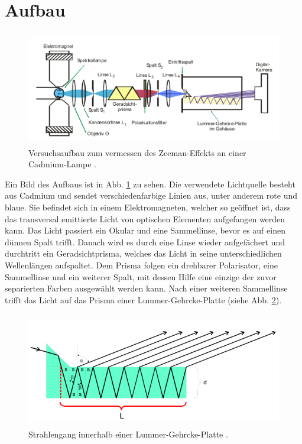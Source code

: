 


    \section{Aufbau}

        
        \begin{figure}[H]
            \centering
            \includegraphics[height=5cm]{aufbau.png}
            \caption{Versuchsaufbau zum vermessen des Zeeman-Effekts an einer Cadmium-Lampe \cite{anneu}.}
            \label{fig:aufbau}
        \end{figure}

        Ein Bild des Aufbaus ist in Abb. \ref{fig:aufbau} zu sehen.
        Die verwendete Lichtquelle besteht aus Cadmium und sendet verschiedenfarbige 
        Linien aus, unter anderem rote und blaue. Sie befindet sich in einem Elektromagneten, 
        welcher so geöffnet ist, dass das transversal emittierte Licht von 
        optischen Elementen aufgefangen werden kann. 
        Das Licht passiert ein Okular und eine Sammellinse, bevor es auf einen dünnen 
        Spalt trifft. Danach wird es durch eine Linse wieder aufgefächert und durchtritt ein 
        Geradsichtprisma, welches das Licht in seine unterschiedlichen Wellenlängen aufspaltet. 
        Dem Prisma folgen ein drehbarer Polarisator, eine Sammellinse und ein weiterer Spalt, 
        mit dessen Hilfe eine einzige der zuvor separierten Farben ausgewählt werden kann. 
        Nach einer weiteren Sammellinse trifft das Licht auf das Prisma einer Lummer-Gehrcke-Platte (siehe Abb. \ref{fig:lummer}). 

        \begin{figure}
            \centering
            \includegraphics[height=5cm]{lummer.png}
            \caption{Strahlengang innerhalb einer Lummer-Gehrcke-Platte \cite{anneu}.}
            \label{fig:lummer}
        \end{figure}

